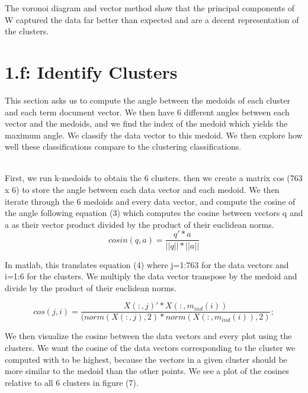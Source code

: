 \documentclass{article}
\begin{document}
The voronoi diagram and vector method show that the principal components of W captured the data far better than expected and are a decent representation of the clusters.

\section*{1.f: Identify Clusters}
This section asks us to compute the angle between the medoids of each cluster and each term document vector.  We then have 6 different angles between each vector and the medoids, and we find the index of the medoid which yields the maximum angle.  We classify the data vector to this medoid.  We then explore how well these classifications compare to the clustering classifications.

\\
First, we run k-medoids to obtain the 6 clusters.  then we create a matrix cos (763 x 6) to store the angle between each data vector and each medoid.  We then iterate through the 6 medoids and every data vector, and compute the cosine of the angle following equation (3) which computes the cosine between vectors q and a as their vector product divided by the product of their euclidean norms.
\begin{equation}
        cosin(q, a)= \frac{q'*a}{||q||*||a||}
\end{equation}

In matlab, this translates equation (4) where j=1:763 for the data vectors and i=1:6 for the clusters.  We multiply the data vector transpose by the medoid and divide by the product of their euclidean norms.

\begin{equation}
        cos(j,i)=  \frac{X(:,j)'*X(:,m_{ind}(i))}{(norm(X(:,j), 2)*norm(X(:,m_{ind}(i)),2)} ;
\end{equation}

We then visualize the cosine between the data vectors and every plot using the clusters.  We want the cosine of the data vectors corresponding to the cluster we computed with to be highest, because the vectors in a given cluster should be more similar to the medoid than the other points. We see a plot of the cosines relative to all 6 clusters in figure (7).
\end{document}
